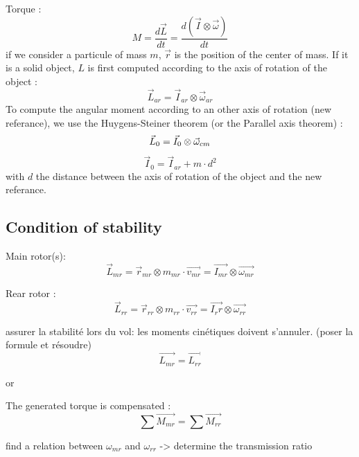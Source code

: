 \documentclass[12pt,a4paper]{article}
\begin{document}
Torque :
\begin{equation}
    M = \frac{d\vec{L}}{dt}=\frac{d(\vec{I} \otimes \vec{\omega})}{dt}
\end{equation}
\medbreak
if we consider a particule of mass $m$, $\vec{r}$ is the position of the center of mass.
If it is a solid object, $L$ is first computed according to the axis of rotation of the object :
\begin{equation}
    \vec{L}_{ar}=\vec{I}_{ar} \otimes \vec{\omega}_{ar}
\end{equation}
To compute the angular moment according to an other axis of rotation (new referance), we use the Huygens-Steiner theorem (or the Parallel axis theorem) :
\begin{equation}
    \vec{L}_{0}=\vec{I}_{0} \otimes \vec{\omega}_{cm}\\
\end{equation}
\begin{equation}
    \vec{I}_{0} = \vec{I}_{ar} + m\cdot d^2
\end{equation}
with $d$ the distance between the axis of rotation of the object and the new referance.
\subsection{Condition of stability}

Main rotor(s):
\begin{equation}
    \vec{L}_{mr}=\vec{r}_{mr} \otimes m_{mr} \cdot \vec{v_{mr}}=\vec{I_{mr}} \otimes \vec{\omega_{mr}}
\end{equation}


Rear rotor :
\begin{equation}
    \vec{L}_{rr}=\vec{r}_{rr} \otimes m_{rr} \cdot \vec{v_{rr}}=\vec{I_rr} \otimes \vec{\omega_{rr}}
\end{equation}

assurer la stabilité lors du vol: les moments cinétiques doivent s'annuler. (poser la formule et résoudre)
\begin{equation}
    \vec{L_{mr}}=\vec{L_{rr}}
\end{equation}

or

The generated torque is compensated :
\begin{equation}
    \sum \vec{M_{mr}}=\sum \vec{M_{rr}}
\end{equation}

find a relation between $\omega_{mr}$ and $\omega_{rr}$ -> determine the transmission ratio
\end{document}
